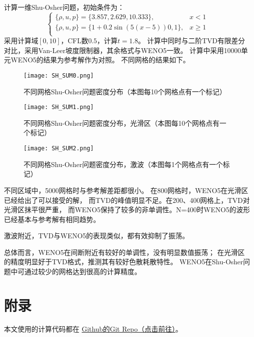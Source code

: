 \documentclass[UTF8,zihao=5]{ctexart} %
\begin{document}
计算一维Shu-Osher问题，初始条件为：
$$
    \left\{
    \begin{array}{ll}
        \{\rho,u,p\} = \{3.857,2.629,10.333\},   & x < 1    \\
        \{\rho,u,p\} = \{1+0.2\sin(5(x-5))0,1\}, & x \geq 1 \\
    \end{array}
    \right.
$$
采用计算域$[0,10]$，CFL数$0.5$，计算$t=1.8$。
计算中同时与二阶TVD有限差分对比，采用Van-Leer坡度限制器，其余格式与WENO5一致。
计算中采用10000单元WENO5的结果为参考解作为对照。
不同网格的结果如下。

\begin{figure}[H]
    \centering
    \texttt{[image: SH\_SUM0.png]}  %
    \caption{不同网格Shu-Osher问题密度分布（本图每10个网格点有一个标记）}
\end{figure}

\begin{figure}[H]
    \centering
    \texttt{[image: SH\_SUM1.png]}  %
    \caption{不同网格Shu-Osher问题密度分布，光滑区（本图每10个网格点有一个标记）}
\end{figure}

\begin{figure}[H]
    \centering
    \texttt{[image: SH\_SUM2.png]}  %
    \caption{不同网格Shu-Osher问题密度分布，激波（本图每1个网格点有一个标记）}
\end{figure}

不同区域中，5000网格时与参考解差距都很小。
在800网格时，WENO5在光滑区已经给出了可以接受的解，
而TVD的峰值明显不足。在200、400网格上，TVD对光滑区抹平很严重，
而WENO5保持了较多的非单调性。N=400时WENO5的波形已经基本与参考解有相同趋势。

激波附近，TVD与WENO5的表现类似，都有效抑制了振荡。

总体而言，WENO5在间断附近有较好的单调性，没有明显数值振荡；
在光滑区的精度明显好于TVD格式，推测其有较好色散耗散特性。
WENO5在Shu-Osher问题中可通过较少的网格达到很高的计算精度。



{}



\section*{附录}

本文使用的计算代码都在
\href{https://github.com/harryzhou2000/HW_ACFD}{Github的Git Repo（点击前往）}。
\end{document}
